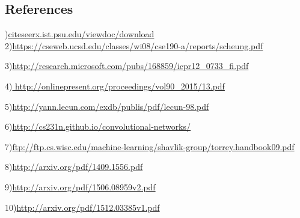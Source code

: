 \documentclass[a4paper]{article}
\begin{document}
\subsection*{References}
)\hyperref{http://citeseerx.ist.psu.edu/viewdoc/download?doi=10.1.1.488.284&rep=rep1&type=pdf}{}{}{citeseerx.ist.psu.edu/viewdoc/download}
2)\url{https://cseweb.ucsd.edu/classes/wi08/cse190-a/reports/scheung.pdf}

3)\url{http://research.microsoft.com/pubs/168859/icpr12_0733_fi.pdf}

4)\url{ http://onlinepresent.org/proceedings/vol90_2015/13.pdf}

5)\url{http://yann.lecun.com/exdb/publis/pdf/lecun-98.pdf}

6)\url{http://cs231n.github.io/convolutional-networks/}

7)\url{ftp://ftp.cs.wisc.edu/machine-learning/shavlik-group/torrey.handbook09.pdf}

8)\url{http://arxiv.org/pdf/1409.1556.pdf}

9)\url{http://arxiv.org/pdf/1506.08959v2.pdf}

10)\url{http://arxiv.org/pdf/1512.03385v1.pdf}
  
\newpage
\appendix
\end{document}
